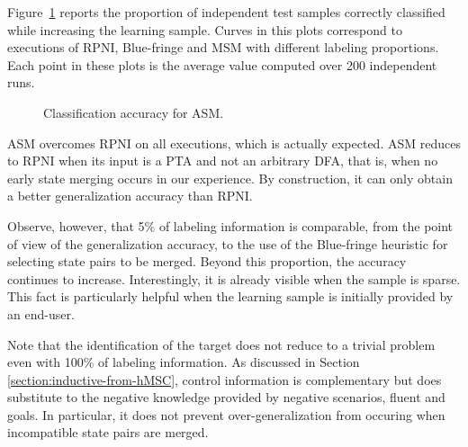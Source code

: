 Figure~\ref{image:evaluation-asm-accuracy} reports the proportion of independent test samples correctly classified while increasing the learning sample. Curves in this plots correspond to executions of RPNI, Blue-fringe and MSM with different labeling proportions. Each point in these plots is the average value computed over 200 independent runs. 

\begin{figure}
\begin{center}
\caption{Classification accuracy for ASM\label{image:evaluation-asm-accuracy}.}
\end{center}
\end{figure}

ASM overcomes RPNI on all executions, which is actually expected. ASM reduces to RPNI when its input is a PTA and not an arbitrary DFA, that is, when no early state merging occurs in our experience. By construction, it can only obtain a better generalization accuracy than RPNI.

Observe, however, that 5\% of labeling information is comparable, from the point of view of the generalization accuracy, to the use of the Blue-fringe heuristic for selecting state pairs to be merged. Beyond this proportion, the accuracy continues to increase. Interestingly, it is already visible when the sample is sparse. This fact is particularly helpful when the learning sample is initially provided by an end-user.

Note that the identification of the target does not reduce to a trivial problem even with 100\% of labeling information. As discussed in Section \ref{section:inductive-from-hMSC}, control information is complementary but does substitute to the negative knowledge provided by negative scenarios, fluent and goals. In particular, it does not prevent over-generalization from occuring when incompatible state pairs are merged. 
